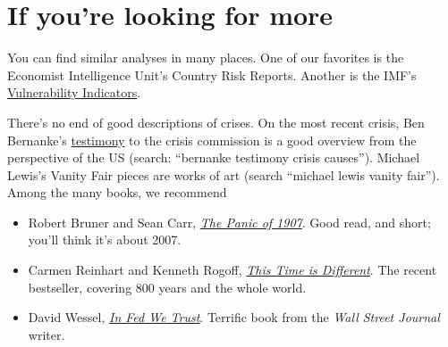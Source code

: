 \section*{If you're looking for more}

You can find similar analyses in many places.
One of our favorites is the 
Economist Intelligence Unit's Country Risk Reports.
Another is the IMF's
\href{http://www.imf.org/external/np/exr/facts/vul.htm}
{Vulnerability Indicators}.

There's no end of good descriptions of crises.
On the most recent crisis, Ben Bernanke's
\href{http://www.federalreserve.gov/newsevents/testimony/bernanke20100902a.htm}
{testimony} to the crisis commission is a good overview
from the perspective of the US
(search:  ``bernanke testimony crisis causes'').
Michael Lewis's Vanity Fair pieces are works of art
(search ``michael lewis vanity fair'').
Among the many books, we recommend
%
\begin{itemize}
\item Robert Bruner and Sean Carr,
\href{http://www.amazon.com/Panic-1907-Lessons-Learned-Markets/dp/0470452587/}
{\it The Panic of 1907\/}.
Good read, and short; you'll think it's about 2007.

\item Carmen Reinhart and Kenneth Rogoff,
\href{http://www.amazon.com/This-Time-Different-Centuries-ebook/dp/B004EYT932/}
{\it This Time is Different\/}.
The recent bestseller, covering 800 years and the whole world.

\item David Wessel,
\href{http://www.amazon.com/Fed-We-Trust-Bernankes-Great/dp/0307459683/}
{\it In Fed We Trust\/}.
Terrific book from the \emph{Wall Street Journal} writer.

\end{itemize}


